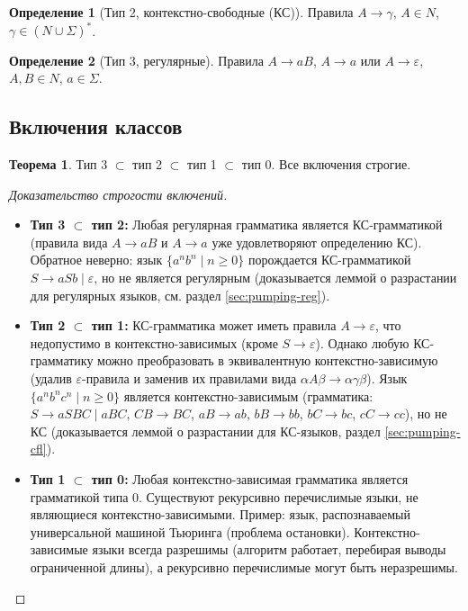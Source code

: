 \documentclass[12pt,a4paper]{article}
\theoremstyle{definition}
\newtheorem{definition}{Определение}[section]
\newtheorem{theorem}{Теорема}[section]
\newcommand{\emptystring}{\varepsilon}
\begin{document}
\begin{definition}[Тип 2, контекстно-свободные (КС)]
Правила $A\to\gamma$, $A\in N$, $\gamma\in (N\cup\Sigma)^*$.
\end{definition}

\begin{definition}[Тип 3, регулярные]
Правила $A\to aB$, $A\to a$ или $A\to\emptystring$, $A,B\in N$, $a\in\Sigma$.
\end{definition}

\subsection*{Включения классов}
\begin{theorem}
Тип 3 $\subset$ тип 2 $\subset$ тип 1 $\subset$ тип 0. Все включения строгие.
\end{theorem}

\begin{proof}[Доказательство строгости включений]
\begin{itemize}
\item \textbf{Тип 3 $\subset$ тип 2:} Любая регулярная грамматика является КС-грамматикой (правила вида $A\to aB$ и $A\to a$ уже удовлетворяют определению КС). Обратное неверно: язык $\{a^n b^n \mid n\ge 0\}$ порождается КС-грамматикой $S\to aSb\mid\emptystring$, но не является регулярным (доказывается леммой о разрастании для регулярных языков, см. раздел \ref{sec:pumping-reg}).
\item \textbf{Тип 2 $\subset$ тип 1:} КС-грамматика может иметь правила $A\to\emptystring$, что недопустимо в контекстно-зависимых (кроме $S\to\emptystring$). Однако любую КС-грамматику можно преобразовать в эквивалентную контекстно-зависимую (удалив $\emptystring$-правила и заменив их правилами вида $\alpha A\beta \to \alpha\gamma\beta$). Язык $\{a^n b^n c^n \mid n\ge 0\}$ является контекстно-зависимым (грамматика: $S\to aSBC\mid aBC$, $CB\to BC$, $aB\to ab$, $bB\to bb$, $bC\to bc$, $cC\to cc$), но не КС (доказывается леммой о разрастании для КС-языков, раздел \ref{sec:pumping-cfl}).
\item \textbf{Тип 1 $\subset$ тип 0:} Любая контекстно-зависимая грамматика является грамматикой типа 0. Существуют рекурсивно перечислимые языки, не являющиеся контекстно-зависимыми. Пример: язык, распознаваемый универсальной машиной Тьюринга (проблема остановки). Контекстно-зависимые языки всегда разрешимы (алгоритм работает, перебирая выводы ограниченной длины), а рекурсивно перечислимые могут быть неразрешимы.
\end{itemize}
\end{proof}
\end{document}
